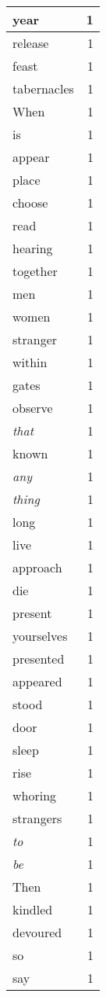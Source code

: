 \begin{center}
\begin{longtable}{l|r}
year & 1 \\ \hline
release & 1 \\ \hline
feast & 1 \\ \hline
tabernacles & 1 \\ \hline
When & 1 \\ \hline
is & 1 \\ \hline
appear & 1 \\ \hline
place & 1 \\ \hline
choose & 1 \\ \hline
read & 1 \\ \hline
hearing & 1 \\ \hline
together & 1 \\ \hline
men & 1 \\ \hline
women & 1 \\ \hline
stranger & 1 \\ \hline
within & 1 \\ \hline
gates & 1 \\ \hline
observe & 1 \\ \hline
\emph{that} & 1 \\ \hline
known & 1 \\ \hline
\emph{any} & 1 \\ \hline
\emph{thing} & 1 \\ \hline
long & 1 \\ \hline
live & 1 \\ \hline
approach & 1 \\ \hline
die & 1 \\ \hline
present & 1 \\ \hline
yourselves & 1 \\ \hline
presented & 1 \\ \hline
appeared & 1 \\ \hline
stood & 1 \\ \hline
door & 1 \\ \hline
sleep & 1 \\ \hline
rise & 1 \\ \hline
whoring & 1 \\ \hline
strangers & 1 \\ \hline
\emph{to} & 1 \\ \hline
\emph{be} & 1 \\ \hline
Then & 1 \\ \hline
kindled & 1 \\ \hline
devoured & 1 \\ \hline
so & 1 \\ \hline
say & 1 \\ \hline

\end{longtable}
\end{center}

